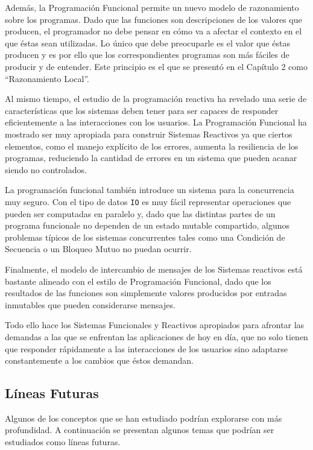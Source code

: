\documentclass[../main.tex]{subfiles}
\begin{document}
Además, la Programación Funcional permite un nuevo modelo de razonamiento sobre los
programas. Dado que las funciones son descripciones de los valores que producen, el
programador no debe pensar en cómo va a afectar el contexto en el que éstas sean utilizadas. Lo 
único que debe preocuparle es el valor que éstas producen y es
por ello que los correspondientes programas son más fáciles de producir y de entender. Este principio es
el que se presentó en el Capítulo 2 como ``Razonamiento Local''.

Al mismo tiempo, el estudio de la programación reactiva ha revelado una serie de
características que los sistemas deben tener para ser capaces de responder eficientemente a 
las interacciones con los usuarios.
La Programación Funcional ha mostrado ser muy apropiada para construir Sistemas Reactivos ya que 
ciertos elementos, como el manejo explícito de los errores, aumenta la resiliencia de
los programas, reduciendo la cantidad de errores en un sistema que pueden acanar siendo no controlados.

La programación funcional también introduce un sistema para la concurrencia muy seguro.
Con el tipo de datos \texttt{IO} es muy fácil representar operaciones que pueden ser
computadas en paralelo y, dado que las distintas partes de un programa funcionale no dependen de un estado
mutable compartido, algunos problemas típicos de los sistemas concurrentes tales como una 
Condición de Secuencia o un Bloqueo Mutuo no puedan ocurrir.

Finalmente, el modelo de intercambio de mensajes de los Sistemas reactivos está bastante
alineado con el estilo de Programación Funcional, dado que los resultados de las funciones
son simplemente valores producidos por entradas inmutables que pueden considerarse mensajes.

Todo ello hace los Sistemas Funcionales y Reactivos apropiados para afrontar las demandas a las que
se enfrentan las aplicaciones de hoy en día, que no solo tienen que responder rápidamente
a las interacciones de los usuarios sino adaptarse constantemente a los cambios que éstos demandan.

\subsection{Líneas Futuras}
Algunos de los conceptos que se han estudiado podrían explorarse con más profundidad. A continuación
se presentan algunos temas que podrían ser estudiados como líneas futuras.
\end{document}
